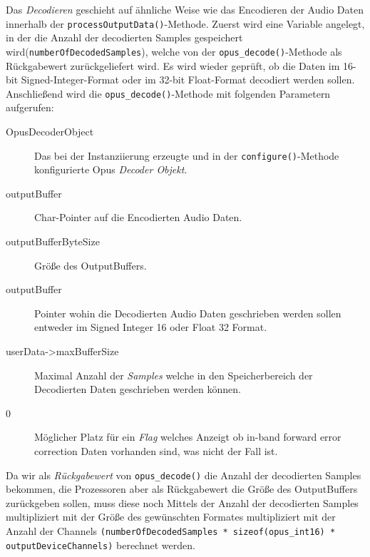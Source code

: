Das \textit{Decodieren} geschieht auf ähnliche Weise wie das Encodieren der Audio Daten innerhalb der \texttt{processOutputData()}-Methode.
Zuerst wird eine Variable angelegt, in der die Anzahl der decodierten Samples gespeichert wird(\texttt{numberOfDecoded\-Samples}), welche von der \texttt{opus\_decode()}-Methode als Rückgabewert zurückgeliefert wird. Es wird wieder geprüft, ob die Daten im 16-bit Signed-Integer-Format oder im 32-bit Float-Format decodiert werden sollen. Anschließend wird die \texttt{opus\_decode()}-Methode mit folgenden Parametern aufgerufen:

\begin{description}
\item[OpusDecoderObject] Das bei der Instanziierung erzeugte und in der \texttt{configure()}-Methode konfigurierte Opus \textit{Decoder Objekt}.
\item[outputBuffer] Char-Pointer auf die Encodierten Audio Daten.
\item[outputBufferByteSize] Größe des OutputBuffers.
\item[outputBuffer] Pointer wohin die Decodierten Audio Daten geschrieben werden sollen entweder im Signed Integer 16 oder Float 32 Format.
\item[userData->maxBufferSize] Maximal Anzahl der \textit{Samples} welche in den Speicherbereich der Decodierten Daten geschrieben werden können.
\item[0] Möglicher Platz für ein \textit{Flag} welches Anzeigt ob in-band forward error correction Daten vorhanden sind, was nicht der Fall ist.
\end{description}

Da wir als \textit{Rückgabewert} von \texttt{opus\_decode()} die Anzahl der decodierten Samples bekommen, die Prozessoren aber als Rückgabewert die Größe des OutputBuffers zurückgeben sollen, muss diese noch Mittels der Anzahl der decodierten Samples multipliziert mit der Größe des gewünschten Formates multipliziert mit der Anzahl der Channels \texttt{(numberOfDecodedSamples * sizeof(opus\_int16) * outputDeviceChannels)} berechnet werden.

